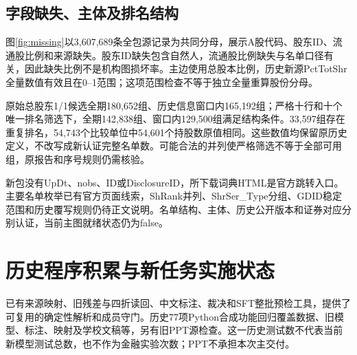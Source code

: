\subsection{字段缺失、主体及排名结构}
图\ref{fig:missing}以3,607,689条全包源记录为共同分母，展示A股代码、股东ID、流通股比例和来源缺失。股东ID缺失包含自然人，流通股比例缺失与名单口径有关，因此缺失比例不是机构图损坏率。主边使用总股本比例，历史新源PctTotShr全量数值有效且在0--1范围；这项范围检查不等于独立全量重算股份分母。



原始总股东1/1候选全期180,652组、历史信息窗口内165,192组；严格十行和十个唯一排名筛选下，全期142,838组、窗口内129,500组满足结构条件。33,597组存在重复排名，54,743个比较单位中54,601个持股数原值相同。这些数值均保留原历史定义，不改写成新认证完整名单数。可能合法的并列使严格筛选不等于全部可用组，原报告和序号规则仍需核验。

新包没有UpDt、nobs、ID或DisclosureID，所下载词典HTML是官方跳转入口。主要名单枚举已有官方页面线索，ShRank并列、ShrSer\_Type分组、GDID稳定范围和历史覆写规则仍待正文说明。名单结构、主体、历史公开版本和证券对应分别认证，当前主图就绪状态仍为false。

\section{历史程序积累与新任务实施状态}
已有来源映射、旧残差与四折读回、中文标注、裁决和SFT整批预检工具，提供了可复用的确定性解析和成员守门。历史77项Python合成功能回归覆盖数据、旧模型、标注、映射及学校文稿等，另有旧PPT源检查。这一历史测试数不代表当前新模型测试总数，也不作为金融实验次数；PPT不承担本次主交付。

